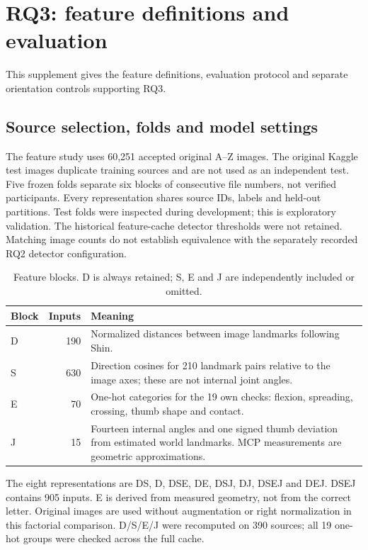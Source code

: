 \clearpage
\onecolumn
\section{RQ3: feature definitions and evaluation}\label{app:ton-protocol}
This supplement gives the feature definitions, evaluation protocol and separate orientation controls supporting RQ3.

\subsection{Source selection, folds and model settings}
The feature study uses 60,251 accepted original A--Z images. The original Kaggle test images duplicate training sources and are not used as an independent test. Five frozen folds separate six blocks of consecutive file numbers, not verified participants. Every representation shares source IDs, labels and held-out partitions. Test folds were inspected during development; this is exploratory validation. The historical feature-cache detector thresholds were not retained. Matching image counts do not establish equivalence with the separately recorded RQ2 detector configuration.

\begin{table}[h]\centering\small
\caption{Feature blocks. D is always retained; S, E and J are independently included or omitted.}
\begin{tabular}{lrp{.70\linewidth}}\toprule
Block & Inputs & Meaning\\\midrule
D & 190 & Normalized distances between image landmarks following Shin.\\
S & 630 & Direction cosines for 210 landmark pairs relative to the image axes; these are not internal joint angles.\\
E & 70 & One-hot categories for the 19 own checks: flexion, spreading, crossing, thumb shape and contact.\\
J & 15 & Fourteen internal angles and one signed thumb deviation from estimated world landmarks. MCP measurements are geometric approximations.\\\bottomrule
\end{tabular}
\end{table}

The eight representations are DS, D, DSE, DE, DSJ, DJ, DSEJ and DEJ. DSEJ contains 905 inputs. E is derived from measured geometry, not from the correct letter. Original images are used without augmentation or right normalization in this factorial comparison. D/S/E/J were recomputed on 390 sources; all 19 one-hot groups were checked across the full cache.

